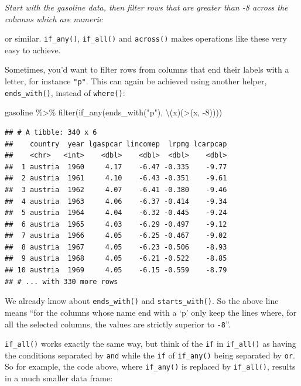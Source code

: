 \documentclass[
]{article}
\newenvironment{Shaded}{\begin{snugshade}}{\end{snugshade}}
\newcommand{\AttributeTok}[1]{\textcolor[rgb]{0.77,0.63,0.00}{#1}}
\newcommand{\DecValTok}[1]{\textcolor[rgb]{0.00,0.00,0.81}{#1}}
\newcommand{\FunctionTok}[1]{\textcolor[rgb]{0.00,0.00,0.00}{#1}}
\newcommand{\NormalTok}[1]{#1}
\newcommand{\SpecialCharTok}[1]{\textcolor[rgb]{0.00,0.00,0.00}{#1}}
\newcommand{\StringTok}[1]{\textcolor[rgb]{0.31,0.60,0.02}{#1}}
\begin{document}
\emph{Start with the gasoline data, then filter rows that are greater than -8 across the columns
which are numeric}

or similar. \texttt{if\_any()}, \texttt{if\_all()} and \texttt{across()} makes operations like these very easy to achieve.

Sometimes, you'd want to filter rows from columns that end their labels with a letter, for instance
\texttt{"p"}. This can again be achieved using another helper, \texttt{ends\_with()}, instead of \texttt{where()}:

\begin{Shaded}
\begin{Highlighting}[]
\NormalTok{gasoline }\SpecialCharTok{\%\textgreater{}\%}
  \FunctionTok{filter}\NormalTok{(}\FunctionTok{if\_any}\NormalTok{(}\FunctionTok{ends\_with}\NormalTok{(}\StringTok{"p"}\NormalTok{), \textbackslash{}(x)(}\StringTok{\textasciigrave{}}\AttributeTok{\textgreater{}}\StringTok{\textasciigrave{}}\NormalTok{(x, }\SpecialCharTok{{-}}\DecValTok{8}\NormalTok{))))}
\end{Highlighting}
\end{Shaded}

\begin{verbatim}
## # A tibble: 340 x 6
##    country  year lgaspcar lincomep  lrpmg lcarpcap
##    <chr>   <int>    <dbl>    <dbl>  <dbl>    <dbl>
##  1 austria  1960     4.17    -6.47 -0.335    -9.77
##  2 austria  1961     4.10    -6.43 -0.351    -9.61
##  3 austria  1962     4.07    -6.41 -0.380    -9.46
##  4 austria  1963     4.06    -6.37 -0.414    -9.34
##  5 austria  1964     4.04    -6.32 -0.445    -9.24
##  6 austria  1965     4.03    -6.29 -0.497    -9.12
##  7 austria  1966     4.05    -6.25 -0.467    -9.02
##  8 austria  1967     4.05    -6.23 -0.506    -8.93
##  9 austria  1968     4.05    -6.21 -0.522    -8.85
## 10 austria  1969     4.05    -6.15 -0.559    -8.79
## # ... with 330 more rows
\end{verbatim}

We already know about \texttt{ends\_with()} and \texttt{starts\_with()}. So the above line means ``for the columns
whose name end with a `p' only keep the lines where, for all the selected columns, the values are
strictly superior to \texttt{-8}''.

\texttt{if\_all()} works exactly the same way, but think of the \texttt{if} in \texttt{if\_all()} as having the conditions
separated by \texttt{and} while the \texttt{if} of \texttt{if\_any()} being separated by \texttt{or}. So for example, the
code above, where \texttt{if\_any()} is replaced by \texttt{if\_all()}, results in a much smaller data frame:
\end{document}

